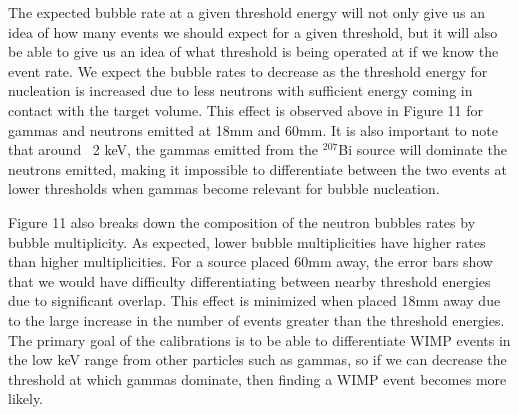 \documentclass[%
12pt,
twoside,
reprint,
amsmath,amssymb,
aps,
]{article}
\begin{document}
	\par The expected bubble rate at a given threshold energy will not only give us an idea of how many events we should expect for a given threshold, but it will also be able to give us an idea of what threshold is being operated at if we know the event rate. We expect the bubble rates to decrease as the threshold energy for nucleation is increased due to less neutrons with sufficient energy coming in contact with the target volume. This effect is observed above in Figure 11 for gammas and neutrons emitted at 18mm and 60mm. It is also important to note that around ~2 keV, the gammas emitted from the $^{207}$Bi source will dominate the neutrons emitted, making it impossible to differentiate between the two events at lower thresholds when gammas become relevant for bubble nucleation.
	\par Figure 11 also breaks down the composition of the neutron bubbles rates by bubble multiplicity. As expected, lower bubble multiplicities have higher rates than higher multiplicities. For a source placed 60mm away, the error bars show that we would have difficulty differentiating between nearby threshold energies due to significant overlap. This effect is minimized when placed 18mm away due to the large increase in the number of events greater than the threshold energies. The primary goal of the calibrations is to be able to differentiate WIMP events in the low keV range from other particles such as gammas, so if we can decrease the threshold at which gammas dominate, then finding a WIMP event becomes more likely.
\end{document}
